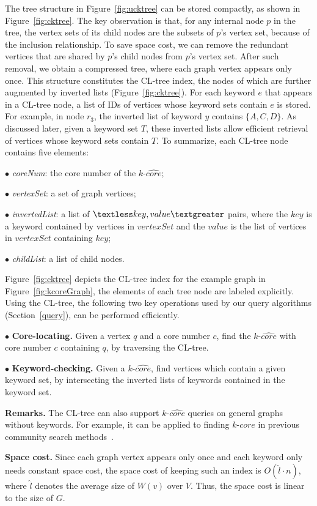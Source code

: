 The tree structure in Figure~\ref{fig:ucktree} can be stored compactly, as shown in Figure~\ref{fig:cktree}.
The key observation is that, for any internal node $p$ in the tree,
the vertex sets of its child nodes are the subsets of $p$'s vertex set,
because of the inclusion relationship. To save space cost,
we can remove the redundant vertices that are shared by $p$'s child nodes from $p$'s vertex set.
After such removal, we obtain a compressed tree,
where each graph vertex appears only once.
This structure constitutes the CL-tree index, the nodes of which are further augmented by inverted lists (Figure~\ref{fig:cktree}).
For each keyword $e$ that appears in a CL-tree node, a list of IDs of vertices whose keyword sets contain $e$ is stored.  For example, in node $r_3$, the inverted list of keyword $y$ contains $\{A,C,D\}$. As discussed later, given a keyword set $T$, these inverted lists allow efficient retrieval of vertices whose keyword sets contain $T$.
To summarize, each CL-tree node contains five elements:

$\bullet$ \emph{coreNum}: the core number of the $k$-$\widehat {core}$;

$\bullet$ \emph{vertexSet}: a set of graph vertices;

$\bullet$ \emph{invertedList}: a list of $\textless key,value\textgreater$ pairs, where the $key$ is a keyword contained by vertices in $vertexSet$ and the $value$ is the list of vertices in $vertexSet$ containing $key$;

$\bullet$ \emph{childList}: a list of child nodes.


Figure~\ref{fig:cktree} depicts the CL-tree index for the example graph in Figure~\ref{fig:kcoreGraph},
the elements of each tree node are labeled explicitly.
Using the CL-tree, the following two key operations used by our query algorithms (Section~\ref{query}), can be performed efficiently.

$\bullet$ {\bf{Core-locating.}} Given a vertex $q$ and a core number $c$,
	find the $k$-$\widehat {core}$ with core number $c$ containing $q$,
	by traversing the CL-tree.
	
$\bullet$ {\bf{Keyword-checking.}} Given a $k$-$\widehat {core}$, find vertices which contain a given keyword set, by intersecting the inverted lists of keywords contained in the keyword set.


\textbf{Remarks.}
The CL-tree can also support $k$-$\widehat {core}$ queries on general graphs without keywords.
For example, it can be applied to finding $k$-$\widehat{core}$ in previous community search methods~\cite{KDD2010}.


\textbf{Space cost.}
Since each graph vertex appears only once and each keyword only needs constant space cost,
the space cost of keeping such an index is $O({\widehat l}\cdot n)$,
where $\widehat l$ denotes the average size of $W(v)$ over $V$.
Thus, the space cost is linear to the size of $G$. 